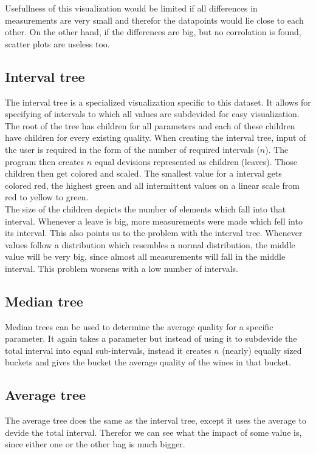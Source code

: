 \documentclass[a4paper,twoside,11pt]{article}
\begin{document}
Usefullness of this visualization would be limited if all differences in measurements are very small and therefor the datapoints would lie close to each other. On the other hand, if the differences are big, but no corrolation is found, scatter plots are useless too.

\subsection{Interval tree}
The interval tree is a specialized visualization specific to this dataset. It allows for specifying of intervals to which all values are subdevided for easy visualization. \\

The root of the tree has children for all parameters and each of these children have children for every existing quality. When creating the interval tree, input of the user is required in the form of the number of required intervals ($n$). The program then creates $n$ equal devisions represented as children (leaves). Those children then get colored and scaled. The smallest value for a interval gets colored red, the highest green and all intermittent values on a linear scale from red to yellow to green.\\

The size of the children depicts the number of elements which fall into that interval. Whenever a leave is big, more measurements were made which fell into its interval. This also points us to the problem with the interval tree. Whenever values follow a distribution which resembles a normal distribution, the middle value will be very big, since almost all measurements will fall in the middle interval. This problem worsens with a low number of intervals.


\subsection{Median tree}
Median trees can be used to determine the average quality for a specific parameter. It again takes a parameter but instead of using it to subdevide the total interval into equal sub-intervals, instead it creates $n$ (nearly) equally sized buckets and gives the bucket the average quality of the wines in that bucket.

\subsection{Average tree}
The average tree does the same as the interval tree, except it uses the average to devide the total interval. Therefor we can see what the impact of some value is, since either one or the other bag is much bigger.
\end{document}
